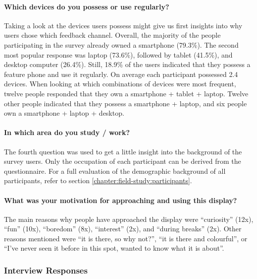 	\paragraph{Which devices do you possess or use regularly?}
	Taking a look at the devices users possess might give us first insights into why users chose which feedback channel. Overall, the majority of the people participating in the survey already owned a smartphone (79.3\%). The second most popular response was laptop (73.6\%), followed by tablet (41.5\%), and desktop computer (26.4\%). Still, 18.9\% of the users indicated that they possess a feature phone and use it regularly. On average each participant possessed 2.4 devices. 
	When looking at which combinations of devices were most frequent, twelve people responded that they own a smartphone + tablet + laptop. Twelve other people indicated that they possess a smartphone + laptop, and six people own a smartphone + laptop + desktop.

	\paragraph{In which area do you study / work?}
	The fourth question was used to get a little insight into the background of the survey users. Only the occupation of each participant can be derived from the questionnaire. For a full evaluation of the demographic background of all participants, refer to section \ref{chapter:field-study:participants}.


	\paragraph{What was your motivation for approaching and using this display?}
	The main reasons why people have approached the display were ``curiosity'' (12x), ``fun'' (10x), ``boredom'' (8x), ``interest'' (2x), and ``during breaks'' (2x). Other reasons mentioned were ``it is there, so why not?'', ``it is there and colourful'', or ``I've never seen it before in this spot, wanted to know what it is about''.





	\subsubsection{Interview Responses}

